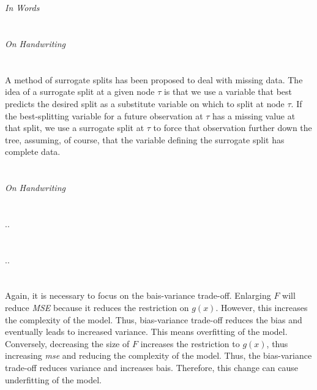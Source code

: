 \documentclass[11pt,a4paper]{article}
\begin{document}
\section{}

\emph{In Words}

\section{}

\emph{On Handwriting}

\section{}

A method of surrogate splits has been proposed to deal with missing data. The idea of a surrogate split at a given node \(\tau\) is that we use a variable that best predicts the desired split as a substitute variable on which to split at node \(\tau\). If the best-splitting variable for a future observation at \(\tau\) has a missing value at that split, we use a surrogate split at \(\tau\) to force that observation further down the tree, assuming, of course, that the variable defining the surrogate split has complete data.

\section{}

\emph{On Handwriting}

\section{}

..

\section{}

..

\section{}

Again, it is necessary to focus on the bais-variance trade-off. 
Enlarging \(F\) will reduce \emph{MSE} because it reduces the restriction on \(g(x)\). However, this increases the complexity of the model. Thus, bias-variance trade-off reduces the bias and eventually leads to increased variance. This means overfitting of the model.
Conversely, decreasing the size of \(F\) increases the restriction to \(g(x)\), thus increasing \emph{mse} and reducing the complexity of the model. Thus, the bias-variance trade-off reduces variance and increases bais. Therefore, this change can cause underfitting of the model.
\end{document}
